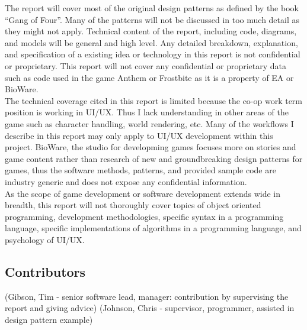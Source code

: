 The report will cover most of the original design patterns as defined by the book ``Gang of Four''\cite{gof}. Many of the patterns will not be discussed in too much detail as they might not apply. Technical content of the report, including code, diagrams, and models will be general and high level. Any detailed breakdown, explanation, and specification of a existing idea or technology in this report is not confidential or proprietary. This report will not cover any confidential or proprietary data such as code used in the game Anthem or Frostbite as it is a property of EA or BioWare.
\\
The technical coverage cited in this report is limited because the co-op work term position is working in UI/UX. Thus I lack understanding in other areas of the game such as character handling, world rendering, etc. Many of the workflows I describe in this report may only apply to UI/UX development within this project. BioWare, the studio for developming games focuses more on stories and game content rather than research of new and groundbreaking design patterns for games, thus the software methods, patterns, and provided sample code are industry generic and does not expose any confidential information.\bs
\\
As the scope of game development or software development extends wide in breadth, this report will not thoroughly cover topics of object oriented programming, development methodologies, specific syntax in a programming language, specific implementations of algorithms in a programming language, and psychology of UI/UX. 

\subsection*{Contributors}

(Gibson, Tim - senior software lead, manager: contribution by supervising the report and giving advice) 
(Johnson, Chris - supervisor, programmer, assisted in design pattern example)

\newpage